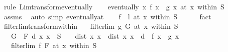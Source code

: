 \begin{isabellebody}
%
\isadelimproof
%
\endisadelimproof
%
\isatagproof
{}\isamarkupfalse%
\ {\isacharparenleft}{\kern0pt}rule\ Lim{\isacharunderscore}{\kern0pt}transform{\isacharunderscore}{\kern0pt}eventually{\isacharparenright}{\kern0pt}\isanewline
\ \ \isamarkupfalse%
\ {\isachardoublequoteopen}eventually\ {\isacharparenleft}{\kern0pt}{\isasymlambda}x{\isachardot}{\kern0pt}\ f\ x\ {\isacharequal}{\kern0pt}\ g\ x{\isacharparenright}{\kern0pt}\ {\isacharparenleft}{\kern0pt}at\ x\ within\ S{\isacharparenright}{\kern0pt}{\isachardoublequoteclose}\isanewline
\ \ \ \ \isamarkupfalse%
\ assms\ \isamarkupfalse%
\ {\isacharparenleft}{\kern0pt}auto\ simp{\isacharcolon}{\kern0pt}\ eventually{\isacharunderscore}{\kern0pt}at{\isacharparenright}{\kern0pt}\isanewline
\ \ \isamarkupfalse%
\ {\isachardoublequoteopen}{\isacharparenleft}{\kern0pt}f\ {\isasymlonglongrightarrow}\ l{\isacharparenright}{\kern0pt}\ {\isacharparenleft}{\kern0pt}at\ x\ within\ S{\isacharparenright}{\kern0pt}{\isachardoublequoteclose}\isanewline
\ \ \ \ \isamarkupfalse%
\ fact\isanewline
{}\isamarkupfalse%
%
\endisatagproof
{\isafoldproof}%
%
\isadelimproof
\isanewline
%
\endisadelimproof
\isanewline
{}\isamarkupfalse%
\ filterlim{\isacharunderscore}{\kern0pt}transform{\isacharunderscore}{\kern0pt}within{\isacharcolon}{\kern0pt}\isanewline
\ \ \ {\isachardoublequoteopen}filterlim\ g\ G\ {\isacharparenleft}{\kern0pt}at\ x\ within\ S{\isacharparenright}{\kern0pt}{\isachardoublequoteclose}\isanewline
\ \ \ {\isachardoublequoteopen}G\ {\isasymle}\ F{\isachardoublequoteclose}\ {\isachardoublequoteopen}{}{\isacharless}{\kern0pt}d{\isachardoublequoteclose}\ {\isachardoublequoteopen}{\isacharparenleft}{\kern0pt}{\isasymAnd}x{\isacharprime}{\kern0pt}{\isachardot}{\kern0pt}\ x{\isacharprime}{\kern0pt}\ {\isasymin}\ S\ {\isasymLongrightarrow}\ {}\ {\isacharless}{\kern0pt}\ dist\ x{\isacharprime}{\kern0pt}\ x\ {\isasymLongrightarrow}\ dist\ x{\isacharprime}{\kern0pt}\ x\ {\isacharless}{\kern0pt}\ d\ {\isasymLongrightarrow}\ f\ x{\isacharprime}{\kern0pt}\ {\isacharequal}{\kern0pt}\ g\ x{\isacharprime}{\kern0pt}{\isacharparenright}{\kern0pt}\ {\isachardoublequoteclose}\isanewline
\ \ \ {\isachardoublequoteopen}filterlim\ f\ F\ {\isacharparenleft}{\kern0pt}at\ x\ within\ S{\isacharparenright}{\kern0pt}{\isachardoublequoteclose}\isanewline
%
\isadelimproof
\ \ %
\endisadelimproof
%
\isatagproof
{}\isamarkupfalse%

\end{isabellebody}
